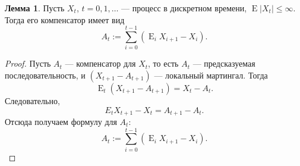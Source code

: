 \documentclass[a4paper,12pt,russian]{article} %
\theoremstyle{definition}
\newtheorem{lemma}{Лемма}
\DeclareMathOperator{\E}{E}
\begin{document}
\begin{lemma}
\label{lemma5-compensator}
Пусть $X_t$, $t=0,1,\dots$ — процесс в дискретном времени, $\E |X_t| \le \infty$. Тогда его компенсатор имеет вид
\[
A_t := \sum_{i=0}^{t-1} (\E_{i} X_{i+1} - X_i).
\]
\end{lemma}

\begin{proof}
Пусть $A_{t}$ — компенсатор для $X_t$, то есть $A_t$ — предсказуемая последовательность, и $ \left(X_{t+1} - A_{t+1} \right)$  — локальный мартингал.
Тогда 
\[
\E_{t} \left(  X_{t+1} - A_{t+1} \right) = X_t - A_t.
\]
Следовательно, 
\[
E_{t} X_{t+1}  -X_t = A_{t+1} - A_t.
\]
Отсюда получаем формулу для $A_t$:
\[
A_t := \sum_{i=0}^{t-1} (\E_{i} X_{i+1} - X_i).
\]


\end{proof}
\end{document}
